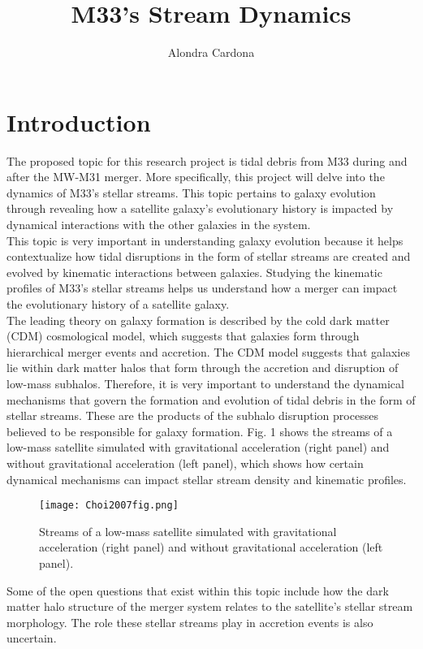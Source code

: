 \documentclass[linenumbers,trackchanges]{aastex7}
\begin{document}
\title{M33's Stream Dynamics}
\author[orcid=0000-0000-0000-0001,sname='Alondra']{Alondra Cardona}

\section{Introduction} 
The proposed topic for this research project is tidal debris from M33 during and after the MW-M31 merger. More specifically, this project will delve into the dynamics of M33's stellar streams. This topic pertains to galaxy evolution through revealing how a satellite galaxy's evolutionary history is impacted by dynamical interactions with the other galaxies in the system.\\
This topic is very important in understanding galaxy evolution because it helps contextualize how tidal disruptions in the form of stellar streams are created and evolved by kinematic interactions between galaxies. Studying the kinematic profiles of M33's stellar streams helps us understand how a merger can impact the evolutionary history of a satellite galaxy\citep{Johnston_1999}.\\
The leading theory on galaxy formation is described by the cold dark matter (CDM) cosmological model, which suggests that galaxies form through hierarchical merger events and accretion. The CDM model suggests that galaxies lie within dark matter halos that form through the accretion and disruption of low-mass subhalos. Therefore, it is very important to understand the dynamical mechanisms that govern the formation and evolution of tidal debris in the form of stellar streams. These are the products of the subhalo disruption processes believed to be responsible for galaxy formation\citep{Shipp_2023}. Fig. 1 shows the streams of a low-mass satellite simulated with gravitational acceleration (right panel) and without gravitational acceleration (left panel), which shows how certain dynamical mechanisms can impact stellar stream density and kinematic profiles.
\begin{figure}[h]
\centering
    \texttt{[image: Choi2007fig.png]}
    \label{fig:enter-label}
    \caption{Streams of a low-mass satellite simulated with gravitational acceleration (right panel) and without gravitational acceleration (left panel)\citep{10.1111/j.1365-2966.2007.12313.x}.}
\end{figure}
\newline
Some of the open questions that exist within this topic include how the dark matter halo structure of the merger system relates to the satellite's stellar stream morphology. The role these stellar streams play in accretion events is also uncertain\citep{10.1093/mnras/sty2474}.\\
\end{document}
